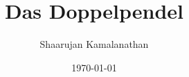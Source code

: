 \documentclass{article}
\begin{document}
\title{Das Doppelpendel}
\author{Shaarujan Kamalanathan}
\date{\today}
\maketitle







\end{document}
